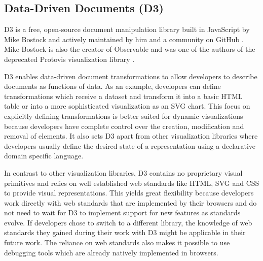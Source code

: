 \subsection{Data-Driven Documents (D3)}

D3 \parencite{D3} is a free, open-source document manipulation library
built in JavaScript by Mike Bostock and actively maintained by him and
a community on GitHub \parencite{D3JS}. Mike Bostock is also the
creator of Observable \parencite{Observable} and was one of the authors of
the deprecated Protovis visualization library \parencite{Protovis}.

D3 enables data-driven document transformations to allow developers to
describe documents as functions of data.  As an example, developers
can define transformations which receive a dataset and transform it
into a basic HTML table or into a more sophisticated visualization as
an SVG chart.  This focus on explicitly defining transformations is
better suited for dynamic visualizations because developers have
complete control over the creation, modification and removal of
elements.  It also sets D3 apart from other visualization libraries
where developers usually define the desired state of a representation
using a declarative domain specific language.

In contrast to other visualization libraries, D3 contains no
proprietary visual primitives and relies on well established web
standards like HTML, SVG and CSS to provide visual representations.
This yields great flexibility because developers work directly with
web standards that are implemented by their browsers and do not need
to wait for D3 to implement support for new features as standards
evolve.  If developers chose to switch to a different library, the
knowledge of web standards they gained during their work with D3 might
be applicable in their future work.  The reliance on web standards
also makes it possible to use debugging tools which are already
natively implemented in browsers.

